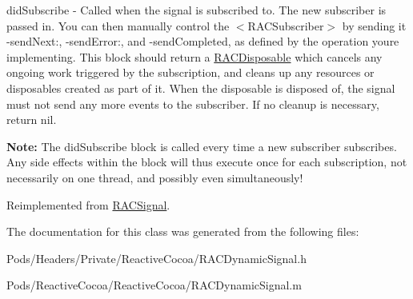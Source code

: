 did\+Subscribe -\/ Called when the signal is subscribed to. The new subscriber is passed in. You can then manually control the $<$\+R\+A\+C\+Subscriber$>$ by sending it -\/send\+Next\+:, -\/send\+Error\+:, and -\/send\+Completed, as defined by the operation you\textquotesingle{}re implementing. This block should return a \mbox{\hyperlink{interface_r_a_c_disposable}{R\+A\+C\+Disposable}} which cancels any ongoing work triggered by the subscription, and cleans up any resources or disposables created as part of it. When the disposable is disposed of, the signal must not send any more events to the {\ttfamily subscriber}. If no cleanup is necessary, return nil.

{\bfseries Note\+:} The {\ttfamily did\+Subscribe} block is called every time a new subscriber subscribes. Any side effects within the block will thus execute once for each subscription, not necessarily on one thread, and possibly even simultaneously! 

Reimplemented from \mbox{\hyperlink{interface_r_a_c_signal_a4ba374f148d6e2a0339c4f4202b4dc26}{R\+A\+C\+Signal}}.



The documentation for this class was generated from the following files\+:\begin{DoxyCompactItemize}
\item 
Pods/\+Headers/\+Private/\+Reactive\+Cocoa/R\+A\+C\+Dynamic\+Signal.\+h\item 
Pods/\+Reactive\+Cocoa/\+Reactive\+Cocoa/R\+A\+C\+Dynamic\+Signal.\+m\end{DoxyCompactItemize}

